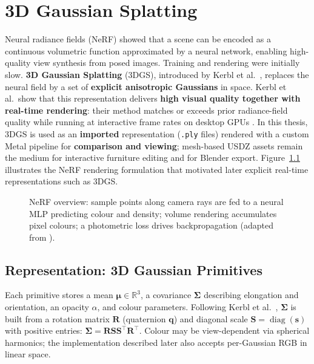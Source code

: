 \chapter{3D Gaussian Splatting}
\label{ch:theory2}

Neural radiance fields (NeRF) showed that a scene can be encoded as a continuous volumetric function approximated by a neural network, enabling high-quality view synthesis from posed images. Training and rendering were initially slow. \textbf{3D Gaussian Splatting} (3DGS), introduced by Kerbl et al.\ \cite{kerbl20233dgs}, replaces the neural field by a set of \textbf{explicit anisotropic Gaussians} in space. Kerbl et al.\ show that this representation delivers \textbf{high visual quality together with real-time rendering}: their method matches or exceeds prior radiance-field quality while running at interactive frame rates on desktop GPUs \cite{kerbl20233dgs}. In this thesis, 3DGS is used as an \textbf{imported} representation (\texttt{.ply} files) rendered with a custom Metal pipeline for \textbf{comparison and viewing}; mesh-based USDZ assets remain the medium for interactive furniture editing and for Blender export. Figure~\ref{fig:ch3_nerf_pipeline} illustrates the NeRF rendering formulation that motivated later explicit real-time representations such as 3DGS.

\begin{figure}[H]
\centering
{}
\caption{NeRF overview: sample points along camera rays are fed to a neural MLP predicting colour and density; volume rendering accumulates pixel colours; a photometric loss drives backpropagation (adapted from \cite{mildenhall2020nerf}).}
\label{fig:ch3_nerf_pipeline}
\end{figure}

\section{Representation: 3D Gaussian Primitives}
\label{sec:3dgs_representation}

Each primitive stores a mean $\boldsymbol{\mu} \in \mathbb{R}^3$, a covariance $\boldsymbol{\Sigma}$ describing elongation and orientation, an opacity $\alpha$, and colour parameters. Following Kerbl et al.\ \cite{kerbl20233dgs}, $\boldsymbol{\Sigma}$ is built from a rotation matrix $\mathbf{R}$ (quaternion $\mathbf{q}$) and diagonal scale $\mathbf{S}=\operatorname{diag}(\mathbf{s})$ with positive entries: $\boldsymbol{\Sigma} = \mathbf{R}\mathbf{S}\mathbf{S}^\top\mathbf{R}^\top$. Colour may be view-dependent via spherical harmonics; the implementation described later also accepts per-Gaussian RGB in linear space.

